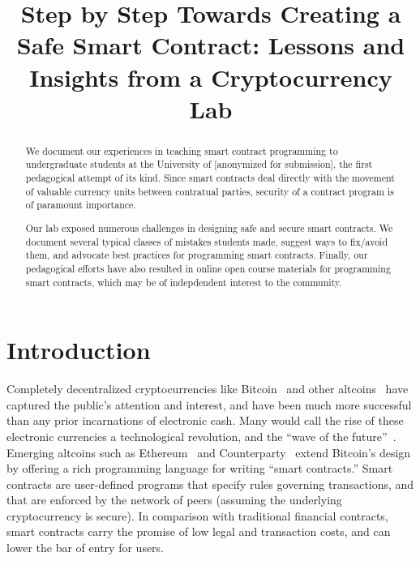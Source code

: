 \documentclass{llncs}
\newcommand{\elaine}[1]{}
\begin{document}
\title{Step by Step Towards Creating a Safe Smart Contract: Lessons and Insights from a Cryptocurrency Lab}

\author{
}

\date{}
\maketitle


\begin{abstract}
We document our experiences in teaching smart contract 
programming to undergraduate students at the University of [anonymized for submission],
the first pedagogical attempt of its kind.
Since smart contracts deal directly with the movement of valuable currency units
between contratual parties, 
security of a contract program is of paramount importance.  

Our lab exposed numerous challenges
in designing safe and secure smart contracts. 
We document several typical classes of mistakes students made, %
suggest ways to fix/avoid them, 
and advocate best practices for programming smart contracts.
Finally, our pedagogical efforts have also resulted in online open
course materials for 
programming smart contracts, which may be of indepdendent interest to the community.
\end{abstract}

\section{Introduction}

Completely decentralized cryptocurrencies like Bitcoin~\cite{satoshi-bitcoin}
and other altcoins~\cite{altcoins}
have captured the public's attention and interest, 
and have been much more successful than any prior incarnations of electronic
cash. Many would call the rise 
of these electronic currencies a technological revolution, and the ``wave of
the future''~\cite{riseandrise}.
Emerging altcoins such as Ethereum~\cite{ethereum} and Counterparty~\cite{counterparty}
extend Bitcoin's design by offering a rich programming language for 
writing ``smart contracts.'' Smart
contracts are user-defined programs that specify rules 
governing transactions, and that are enforced by
the network of peers (assuming the underlying cryptocurrency is secure). 
In comparison with traditional
financial contracts, smart contracts carry the promise of low legal 
and transaction costs, and can 
lower the bar of entry for users.
\end{document}

